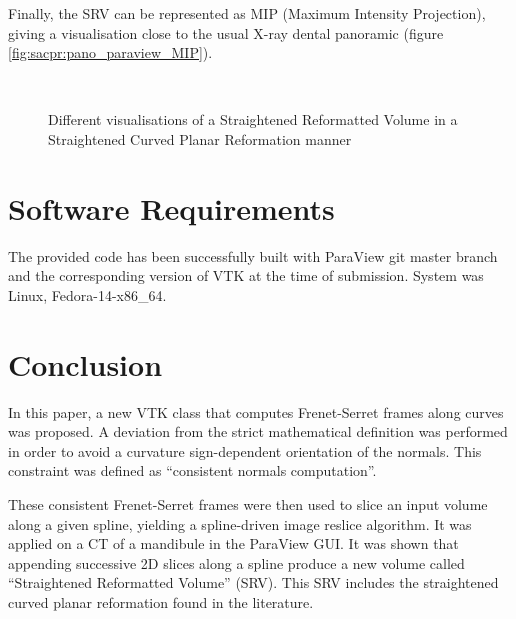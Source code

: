 \documentclass{InsightArticle}
\begin{document}
Finally, the SRV can be represented as MIP (Maximum Intensity Projection), 
giving a visualisation close to the usual X-ray dental panoramic
(figure \ref{fig:sacpr:pano_paraview_MIP}).
%
\begin{figure}
\centering
{}\\
\caption{Different visualisations of a Straightened Reformatted Volume in a
Straightened Curved Planar Reformation manner}
\label{fig:sacpr}
\end{figure}
%
\section{Software Requirements}
%
The provided code has been successfully built with ParaView git master branch
and the corresponding version of VTK at the time of submission. System was
Linux, Fedora-14-x86\_64.
%
\section{Conclusion}
%
In this paper, a new VTK class that computes Frenet-Serret frames along curves
was proposed. A deviation from the strict mathematical definition was performed
in order to avoid a curvature sign-dependent orientation of the normals. This
constraint was defined as ``consistent normals computation''.

These consistent Frenet-Serret frames were then used to slice an input volume
along a given spline, yielding a spline-driven image reslice algorithm. It was
applied on a CT of a mandibule in the ParaView GUI. It was shown that appending
successive 2D slices along a spline produce a new volume called ``Straightened
Reformatted Volume'' (SRV). This SRV includes the straightened curved planar
reformation found in the literature.
\end{document}
